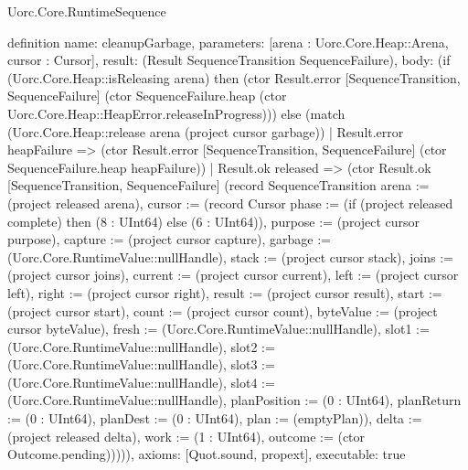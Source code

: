 \begin{lexlean}{Uorc.Core.RuntimeSequence}
\begin{semanticmodule}
definition{
  name: cleanupGarbage,
  parameters: [arena : Uorc.Core.Heap::Arena, cursor : Cursor],
  result: (Result SequenceTransition SequenceFailure),
  body: (if (Uorc.Core.Heap::isReleasing arena) then (ctor Result.error [SequenceTransition, SequenceFailure] (ctor SequenceFailure.heap (ctor Uorc.Core.Heap::HeapError.releaseInProgress))) else (match (Uorc.Core.Heap::release arena (project cursor garbage))
    | Result.error heapFailure => (ctor Result.error [SequenceTransition, SequenceFailure] (ctor SequenceFailure.heap heapFailure))
    | Result.ok released => (ctor Result.ok [SequenceTransition, SequenceFailure] (record SequenceTransition {arena := (project released arena), cursor := (record Cursor {phase := (if (project released complete) then (8 : UInt64) else (6 : UInt64)), purpose := (project cursor purpose), capture := (project cursor capture), garbage := (Uorc.Core.RuntimeValue::nullHandle), stack := (project cursor stack), joins := (project cursor joins), current := (project cursor current), left := (project cursor left), right := (project cursor right), result := (project cursor result), start := (project cursor start), count := (project cursor count), byteValue := (project cursor byteValue), fresh := (Uorc.Core.RuntimeValue::nullHandle), slot1 := (Uorc.Core.RuntimeValue::nullHandle), slot2 := (Uorc.Core.RuntimeValue::nullHandle), slot3 := (Uorc.Core.RuntimeValue::nullHandle), slot4 := (Uorc.Core.RuntimeValue::nullHandle), planPosition := (0 : UInt64), planReturn := (0 : UInt64), planDest := (0 : UInt64), plan := (emptyPlan)}), delta := (project released delta), work := (1 : UInt64), outcome := (ctor Outcome.pending)})))),
  axioms: [Quot.sound, propext],
  executable: true
}


\end{semanticmodule}
\end{lexlean}
